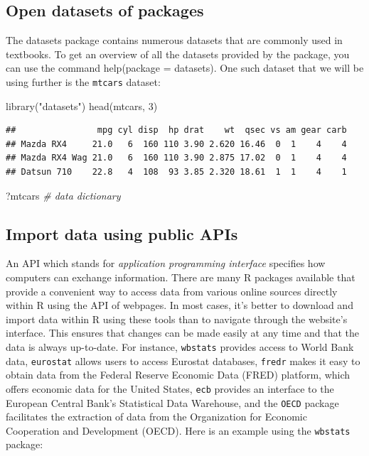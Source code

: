 \documentclass[
  12pt,
  oneside]{book}
\newenvironment{Shaded}{\begin{snugshade}}{\end{snugshade}}
\newcommand{\CommentTok}[1]{\textcolor[rgb]{0.56,0.35,0.01}{\textit{#1}}}
\newcommand{\DecValTok}[1]{\textcolor[rgb]{0.00,0.00,0.81}{#1}}
\newcommand{\FunctionTok}[1]{\textcolor[rgb]{0.00,0.00,0.00}{#1}}
\newcommand{\NormalTok}[1]{#1}
\newcommand{\StringTok}[1]{\textcolor[rgb]{0.31,0.60,0.02}{#1}}
\theoremstyle{definition}
\theoremstyle{definition}
\theoremstyle{definition}
\theoremstyle{definition}
\theoremstyle{remark}
\begin{document}
\hypertarget{open-datasets-of-packages}{%
\subsection{Open datasets of packages}\label{open-datasets-of-packages}}

The datasets package contains numerous datasets that are commonly used in textbooks.
To get an overview of all the datasets provided by the package, you can use the command help(package = datasets).
One such dataset that we will be using further is the \texttt{mtcars} dataset:

\begin{Shaded}
\begin{Highlighting}[]
\FunctionTok{library}\NormalTok{(}\StringTok{"datasets"}\NormalTok{)}
\FunctionTok{head}\NormalTok{(mtcars, }\DecValTok{3}\NormalTok{)}
\end{Highlighting}
\end{Shaded}

\begin{verbatim}
##                mpg cyl disp  hp drat    wt  qsec vs am gear carb
## Mazda RX4     21.0   6  160 110 3.90 2.620 16.46  0  1    4    4
## Mazda RX4 Wag 21.0   6  160 110 3.90 2.875 17.02  0  1    4    4
## Datsun 710    22.8   4  108  93 3.85 2.320 18.61  1  1    4    1
\end{verbatim}

\begin{Shaded}
\begin{Highlighting}[]
\NormalTok{?mtcars  }\CommentTok{\# data dictionary}
\end{Highlighting}
\end{Shaded}

\hypertarget{import-data-using-public-apis}{%
\subsection{Import data using public APIs}\label{import-data-using-public-apis}}

An API which stands for \emph{application programming interface} specifies how computers can exchange information. There are many R packages available that provide a convenient way to access data from various online sources directly within R using the API of webpages. In most cases, it's better to download and import data within R using these tools than to navigate through the website's interface. This ensures that changes can be made easily at any time and that the data is always up-to-date. For instance, \texttt{wbstats} provides access to World Bank data, \texttt{eurostat} allows users to access Eurostat databases, \texttt{fredr} makes it easy to obtain data from the Federal Reserve Economic Data (FRED) platform, which offers economic data for the United States, \texttt{ecb} provides an interface to the European Central Bank's Statistical Data Warehouse, and the \texttt{OECD} package facilitates the extraction of data from the Organization for Economic Cooperation and Development (OECD). Here is an example using the \texttt{wbstats} package:
\end{document}
